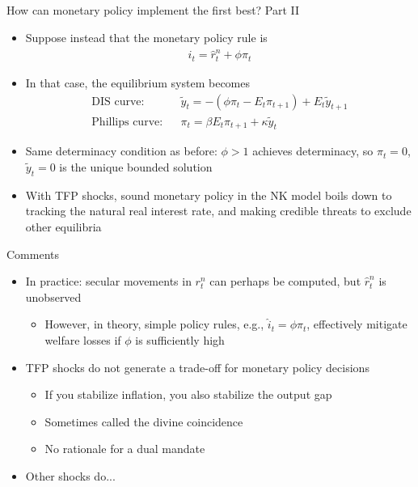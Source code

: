 \documentclass[9pt,xcolor={dvipsnames}]{beamer}
\newcommand{\bit}{\begin{itemize}}
\newcommand{\eit}{\end{itemize}}
\newcommand{\bc}{\color{blue}}
\begin{document}
\begin{frame}{How can monetary policy implement the first best? Part II}

\bit
\setlength\itemsep{1.5em}
\item Suppose instead that the monetary policy rule is 
\begin{eqnarray}
\hat i_t = \hat r^n_t+ \phi \pi_t  \nonumber
\end{eqnarray}

\item In that case, the equilibrium system becomes
\begin{eqnarray}
\text{DIS curve:} && \tilde y_t = - (\phi \pi_t - E_t \pi_{t+1}) + E_t \tilde y_{t+1}  \nonumber \\
\text{Phillips curve:} && \pi_t = \beta E_t \pi_{t+1} + \kappa \tilde y_t \nonumber 
\end{eqnarray}

\item Same determinacy condition as before: $\phi>1$ achieves determinacy, so $\pi_t = 0$, $\tilde y_t=0$ is the unique bounded solution

\item With TFP shocks, sound monetary policy in the NK model boils down to tracking the natural real interest rate, and making credible threats to exclude other equilibria
\eit

\end{frame}


\begin{frame}{Comments}

\bit
\setlength\itemsep{1.5em}
\item In practice: secular movements in $r^n_t$ can perhaps be computed, but $\hat r^n_t$ is unobserved
\bit
\setlength\itemsep{0.5em}
	\item However, in theory, simple policy rules, e.g., $\hat i_t = \phi \pi_t$, effectively mitigate welfare losses if $\phi$ is sufficiently high
\eit

\item TFP shocks do not generate a trade-off for monetary policy decisions
\bit
\setlength\itemsep{0.5em}
\item If you stabilize inflation, you also stabilize the output gap

\item Sometimes called the {\bc divine coincidence}

\item No rationale for a dual mandate
\eit

\item Other shocks do...

\eit

\end{frame}
\end{document}
